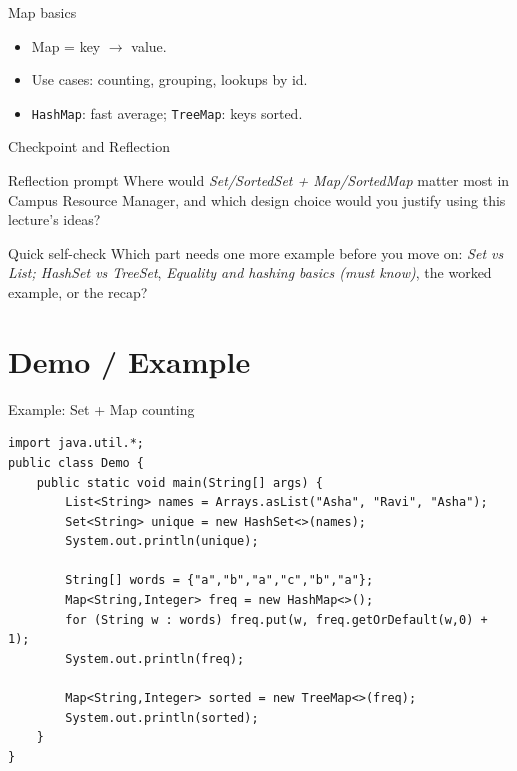 \documentclass{beamer}
\begin{document}
\begin{frame}{Map basics}
  \begin{itemize}[<+->]
    \item Map = key $\rightarrow$ value.
    \item Use cases: counting, grouping, lookups by id.
    \item \texttt{HashMap}: fast average; \texttt{TreeMap}: keys sorted.
  \end{itemize}
  \slidesources{\OOPSUnitVSources}
\end{frame}

\begin{frame}{Checkpoint and Reflection}
\begin{block}{Reflection prompt}
Where would \textit{Set/SortedSet + Map/SortedMap} matter most in Campus Resource Manager, and which design choice would you justify using this lecture's ideas?
\end{block}
\begin{block}{Quick self-check}
Which part needs one more example before you move on: \textit{Set vs List; HashSet vs TreeSet}, \textit{Equality and hashing basics (must know)}, the worked example, or the recap?
\end{block}
  \slidesources{\OOPSUnitVSources}
\end{frame}

\section{Demo / Example}
\label{sec:demo}

\begin{frame}[fragile,shrink=8]{Example: Set + Map counting}
\begin{lstlisting}
import java.util.*;
public class Demo {
    public static void main(String[] args) {
        List<String> names = Arrays.asList("Asha", "Ravi", "Asha");
        Set<String> unique = new HashSet<>(names);
        System.out.println(unique);

        String[] words = {"a","b","a","c","b","a"};
        Map<String,Integer> freq = new HashMap<>();
        for (String w : words) freq.put(w, freq.getOrDefault(w,0) + 1);
        System.out.println(freq);

        Map<String,Integer> sorted = new TreeMap<>(freq);
        System.out.println(sorted);
    }
}
\end{lstlisting}
  \slidesources{\OOPSUnitVSources}
\end{frame}
\end{document}
